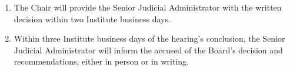 \begin{enumerate}
    \item The Chair will provide the Senior Judicial Administrator with the written decision within two Institute business days.
    
    \item Within three Institute business days of the hearing's conclusion, the Senior Judicial Administrator will inform the accused of the Board’s decision and recommendations, either in person or in writing.
\end{enumerate}